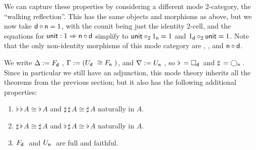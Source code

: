 \documentclass{drl-common/llncs}
\newcommand{\tc}[2]{\ensuremath{#1 \Rightarrow #2}}
\newcommand\compo[2]{\ensuremath{#1 \circ #2}}
\newcommand\comph[2]{\ensuremath{#1 \mathbin{\circ_2} #2}}
\newcommand\F[2]{\ensuremath{F_{#1} \,\, #2}}
\newcommand\U[2]{\ensuremath{U_{#1} \,\, #2}}
\newcommand\Bx[2]{\ensuremath{\Box_{#1} \, {#2}}}
\newcommand\Crc[2]{\ensuremath{\bigcirc_{#1} \, {#2}}}
\newcommand\Flat[1]{\ensuremath{\flat \, {#1}}}
\newcommand\Sharp[1]{\ensuremath{\sharp \, {#1}}}
\newcommand\iso{\cong}
\begin{document}
We can capture these properties by considering a different mode
2-category, the ``walking reflection''.  This has the same objects and
morphisms as above, but we now take $\compo{\dsd d}{\dsd n} = 1$, with
the counit being just the identity 2-cell, and the equations for
$\dsd{unit} : \tc {1} {\compo{\dsd n}{\dsd d}}$ simplify to
$\comph{\dsd{unit}}{1_{\dsd n}} = 1$ and $\comph{1_{\dsd d}}{\dsd{unit}}
= 1$.  Note that the only non-identity morphisms of this mode category
are , , and \compo{\dsd{n}}{\dsd{d}}.  

We write $\Delta := \F{\dsd{d}}{}$, $\Gamma := (\U{\dsd d}{} \iso
\F{\dsd n}{})$, and $\nabla := \U{\dsd{n}}{}$, so $\Flat{} =
\Bx{\dsd{d}}{}$ and $\Sharp{} = \Crc{\dsd{n}}{}$.  Since in particular
we still have an adjunction, this mode theory inherits all the theorems
from the previous section; but it also has the following additional
properties:

\begin{theorem}
\begin{enumerate}
\item $\Flat{\Flat A} \iso \Flat A$ and $\Sharp{\Sharp A} \iso \Sharp A$
  naturally in $A$.
\item $\Sharp{\Flat A} \iso \Sharp{A}$ 
and $\Flat{\Sharp A} \iso \Flat{A}$ naturally in $A$.
\item \F{\dsd{d}}{} and \U{\dsd{n}}{} are full and faithful.
\end{enumerate}
\end{theorem}


\end{document}
